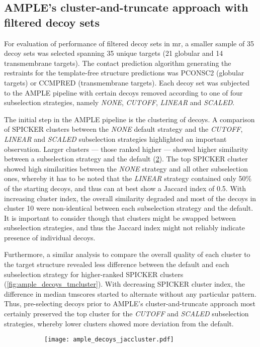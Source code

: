 \subsection{AMPLE's cluster-and-truncate approach with filtered decoy sets}
For evaluation of performance of filtered decoy sets in \gls{mr}, a smaller sample of 35 decoy sets was selected spanning 35 unique targets (21 globular and 14 transmembrane targets). The contact prediction algorithm generating the restraints for the template-free structure predictions was PCONSC2 (globular targets) or CCMPRED (transmembrane targets). Each decoy set was subjected to the AMPLE pipeline with certain decoys removed according to one of four subselection strategies, namely \textit{NONE}, \textit{CUTOFF}, \textit{LINEAR} and \textit{SCALED}.

The initial step in the AMPLE pipeline is the clustering of decoys. A comparison of SPICKER clusters between the \textit{NONE} default strategy and the \textit{CUTOFF}, \textit{LINEAR} and \textit{SCALED} subselection strategies highlighted an important observation. Larger clusters --- those ranked higher --- showed higher similarity between a subselection strategy and the default (\cref{fig:ample_decoys_jaccluster}). The top SPICKER cluster showed high similarities between the \textit{NONE} strategy and all other subselection ones, whereby it has to be noted that the \textit{LINEAR} strategy contained only 50\% of the starting decoys, and thus can at best show a Jaccard index of 0.5. With increasing cluster index, the overall similarity degraded and most of the decoys in cluster 10 were non-identical between each subselection strategy and the default. It is important to consider though that clusters might be swapped between subselection strategies, and thus the Jaccard index might not reliably indicate presence of individual decoys.

Furthermore, a similar analysis to compare the overall quality of each cluster to the target structure revealed less difference between the default and each subselection strategy for higher-ranked SPICKER clusters (\cref{fig:ample_decoys_tmcluster}). With decreasing SPICKER cluster index, the difference in median \gls{tmscore}s started to alternate without any particular pattern. Thus, pre-selecting decoys prior to AMPLE's cluster-and-truncate approach most certainly preserved the top cluster for the \textit{CUTOFF} and \textit{SCALED} subselection strategies, whereby lower clusters showed more deviation from the default.

\begin{figure}[H]
    \centering
    \begin{subfigure}[b]{\textwidth}
        \texttt{[image: ample\_decoys\_jaccluster.pdf]}
        \caption{}
        \label{fig:ample_decoys_jaccluster}
    \end{subfigure}
\end{figure}

